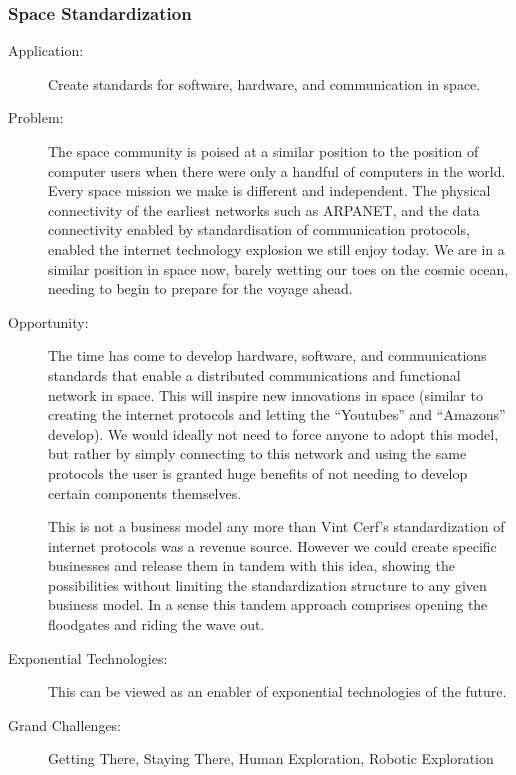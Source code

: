 \subsubsection{Space Standardization}
\begin{description}   \item[Application:] Create standards for software, hardware, and   communication in space.
 
\item[Problem:] The space   community is poised at a similar position to the position of computer   users when there were only a handful of computers in the world. Every space mission we make is different and independent. The physical   connectivity of the earliest networks such as ARPANET, and the data connectivity enabled by standardisation of communication protocols,   enabled the internet technology explosion we still enjoy today. We are   in a similar position in space now, barely wetting our toes on the cosmic ocean, needing to begin to prepare for the voyage ahead.
 
\item[Opportunity:] The time has   come to develop hardware, software, and communications standards that   enable a distributed communications and functional network in space.   This will inspire new innovations in space (similar to creating the   internet protocols and letting the ``Youtubes'' and ``Amazons'' develop).  We would ideally not need to force anyone to adopt this model, but  rather  by simply connecting to this network and using the same  protocols the  user is granted huge benefits of not needing to develop  certain  components themselves.
 
This is not a business model any   more than Vint Cerf's standardization of internet protocols was a   revenue source. However we could create specific businesses and release   them in tandem with this idea, showing the possibilities without   limiting the standardization structure to any given business model. 
In a sense this tandem approach comprises opening the floodgates and riding the wave out.
 
\item[Exponential Technologies:]   This can be viewed as an enabler of exponential technologies of the future. 
 
\item[Grand Challenges:] Getting There, Staying There, Human Exploration, Robotic Exploration


\end{description}
